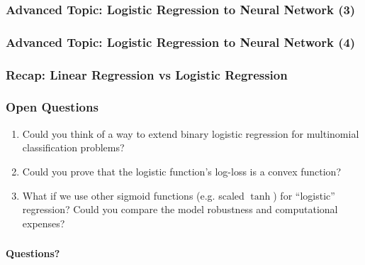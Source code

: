 \documentclass[10pt,aspectratio=169]{beamer}
\begin{document}
      \begin{frame}
        \frametitle{Advanced Topic: Logistic Regression to Neural Network (3)}
        
      \end{frame}

      \begin{frame}
        \frametitle{Advanced Topic: Logistic Regression to Neural Network (4)}
        
      \end{frame}

      \begin{frame}
        \frametitle{Recap: Linear Regression vs Logistic Regression}
        
      \end{frame}

      \begin{frame}
        \frametitle{Open Questions}

        \begin{enumerate}
        \item Could you think of a way to extend binary logistic regression for multinomial classification problems?

          
        \item Could you prove that the logistic function's log-loss is a convex function?

          
        \item What if we use other sigmoid functions (e.g. scaled $\tanh$) for ``logistic'' regression? Could you compare the model robustness and computational expenses?
        
        \end{enumerate}
        
      \end{frame}

      \begin{frame}[c]
        \frametitle{}
        \centering
        \vspace{3em}
        {\Huge \bfseries Questions?}
      \end{frame}
      
    
    
\end{document}
